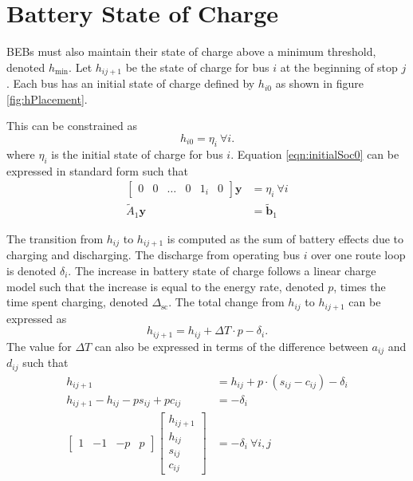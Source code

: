 \section{Battery State of Charge}
BEBs must also maintain their state of charge above a minimum threshold, denoted $h_{\text{min}}$. Let $h_{ij+1}$ be the state of charge for bus $i$ at the beginning of stop $j$. Each bus has an initial state of charge defined by $h_{i0}$ as shown in figure \ref{fig:hPlacement}. 

This can be constrained as
\begin{equation}\label{eqn:initialSoc0}
	h_{i0} = \eta_{i} \ \forall i.
\end{equation}
where $\eta_{i}$ is the initial state of charge for bus $i$.
Equation \ref{eqn:initialSoc0} can be expressed in standard form such that
\begin{equation} \begin{aligned}
	\begin{bmatrix}0 & 0 & \hdots & 0 & 1_i& 0 \end{bmatrix}\mathbf{y} &= \eta_i \ \forall i \\
		\tilde{A}_1\mathbf{y} &= \tilde{\mathbf{b}}_1
\end{aligned} \end{equation}

\par The transition from $h_{ij}$ to $h_{ij+1}$ is computed as the sum of battery effects due to charging and discharging. The discharge from operating bus $i$ over one route loop is denoted $\delta_i$. The increase in battery state of charge follows a linear charge model such that the increase is equal to the energy rate, denoted $p$, times the time spent charging, denoted $\Delta_{\text{sc}}$.
The total change from $h_{ij}$ to $h_{ij+1}$ can be expressed as
\begin{equation}
	h_{ij+1} = h_{ij} + \Delta T\cdot p - \delta_i.
\end{equation}
The value for $\Delta T$ can also be expressed in terms of the difference between $a_{ij}$ and $d_{ij}$ such that
\begin{equation}\label{eqn:socDynamic1}\begin{aligned}
	h_{ij+1} &= h_{ij} + p\cdot \left ( s_{ij} - c_{ij} \right ) - \delta_i\\
	h_{ij+1} - h_{ij} - ps_{ij} + pc_{ij} &= -\delta_i\\
	\begin{bmatrix} 1 & -1 & -p & p\end{bmatrix} \begin{bmatrix}h_{ij+1} \\ h_{ij} \\ s_{ij} \\ c_{ij} \end{bmatrix} &= -\delta_i \ \forall i,j
\end{aligned}\end{equation}
